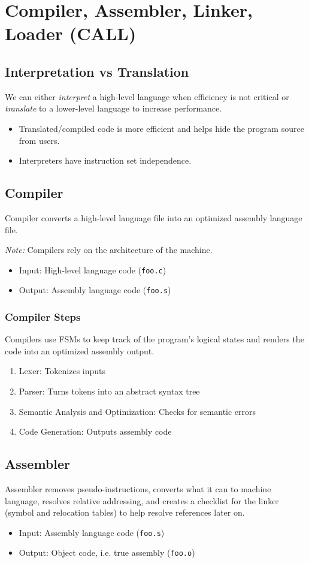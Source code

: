 \chapter{Compiler, Assembler, Linker, Loader (CALL)}

\section{Interpretation vs Translation}
We can either \emph{interpret} a high-level language when efficiency is not critical or \emph{translate} to a lower-level language to increase performance.
\begin{itemize}
    \item Translated/compiled code is more efficient and helps hide the program source from users.
    \item Interpreters have instruction set independence.
\end{itemize}

\section{Compiler}
Compiler converts a high-level language file into an optimized assembly language file. 

\emph{Note:} Compilers rely on the architecture of the machine.
\begin{itemize}
    \item Input: High-level language code (\texttt{foo.c})
    \item Output: Assembly language code (\texttt{foo.s})
\end{itemize}

\subsection{Compiler Steps}
Compilers use FSMs to keep track of the program's logical states and renders the code into an optimized assembly output.
\begin{enumerate}
    \item Lexer: Tokenizes inputs
    \item Parser: Turns tokens into an abstract syntax tree
    \item Semantic Analysis and Optimization: Checks for semantic errors
    \item Code Generation: Outputs assembly code
\end{enumerate}

\section{Assembler}
Assembler removes pseudo-instructions, converts what it can to machine language, resolves relative addressing, and creates a checklist for the linker (symbol and relocation tables) to help resolve references later on.
\begin{itemize}
    \item Input: Assembly language code (\texttt{foo.s})
    \item Output: Object code, i.e. true assembly (\texttt{foo.o})
\end{itemize}

